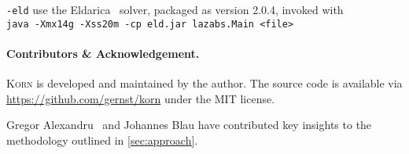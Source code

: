 \documentclass{llncs}
\newcommand{\Korn}{\textsc{Korn}\xspace}
\begin{document}
\medskip

\texttt{-eld}
    \tabto{2cm} use the Eldarica~\cite{hojjat2018eldarica} solver, packaged as version 2.0.4, invoked with \\
    \tabto{2cm} \texttt{java -Xmx14g -Xss20m -cp eld.jar lazabs.Main <file>}
    

    
\paragraph{Contributors \& Acknowledgement.}

\Korn is developed and maintained by the author.
The source code is available via \url{https://github.com/gernst/korn} under the MIT license.

Gregor Alexandru~\cite{alexandru2019} and Johannes Blau have contributed
key insights to the methodology outlined in \cref{sec:approach}.



\end{document}
